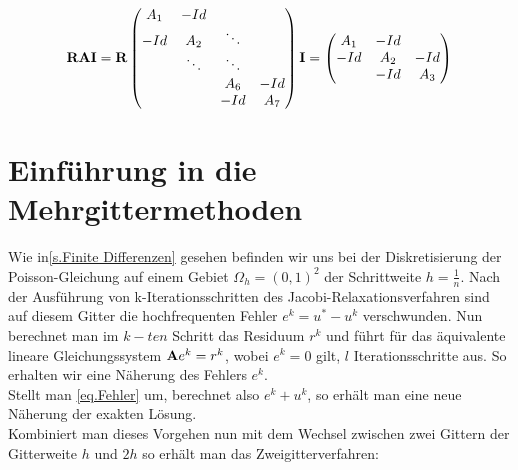 \begin{equation}
{\textbf{R}}{\textbf{A}}{\textbf{I}} = {\textbf{R}}
\begin{pmatrix}
A_{1} & -Id \\
-Id & A_{2} & \ddots \\
 & \ddots & \ddots \\
 & & A_{6} & -Id\\
 & & -Id & A_{7}
\end{pmatrix}
{\textbf{I}} = 
\begin{pmatrix}
A_{1} & -Id \\
-Id & A_{2} & -Id \\
 & -Id & A_{3}
\end{pmatrix}
\end{equation}

\section{Einführung in die Mehrgittermethoden}

Wie in\autoref{s.Finite Differenzen} gesehen befinden wir uns bei der Diskretisierung der Poisson-Gleichung auf einem Gebiet $\Omega_{h} = (0,1)^{2}$ der Schrittweite $h = \frac {1} {n}$. Nach der Ausführung von k-Iterationsschritten des Jacobi-Relaxationsverfahren sind auf diesem Gitter die hochfrequenten Fehler $e^{k} = u^{*} - u^{k}$ verschwunden. Nun berechnet man im $k-ten$ Schritt das Residuum $r^{k}$ und führt für das äquivalente lineare Gleichungssystem ${\textbf{A}}e^{k} = r^{k}$, wobei $e^{k} = 0$ gilt, $l$ Iterationsschritte aus. So erhalten wir eine Näherung des Fehlers $e^{k}$. \\
Stellt man \autoref{eq.Fehler} um, berechnet also $e^{k} + u^{k}$, so erhält man eine neue Näherung der exakten Lösung. \\
Kombiniert man dieses Vorgehen nun mit dem Wechsel zwischen zwei Gittern der Gitterweite $h$ und $2h$ so erhält man das Zweigitterverfahren:

